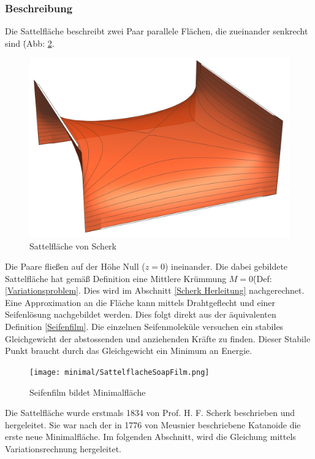 \begin{refsection}
\subsubsection{Beschreibung}
Die Sattelfläche beschreibt zwei Paar parallele Flächen, die zueinander senkrecht sind \.(Abb: \ref{fig:SoapScherk}.
\begin{figure}\label{fig:Scherk}
  \centering
  \includegraphics[scale=0.2]{minimal/HFSherk.png}
  \caption{Sattelfläche von Scherk} 
\end{figure}
Die Paare fließen auf der Höhe Null ($z=0$) ineinander. Die dabei gebildete Sattelfläche hat gemäß Definition eine Mittlere Krümmung $M=0$\.(Def: \ref{Variationsproblem}. Dies wird im Abschnitt \ref{Scherk Herleitung}  nachgerechnet.\\ Eine Approximation an die Fläche kann mittels Drahtgeflecht und einer Seifenlösung nachgebildet werden. Dies folgt direkt aus der äquivalenten Definition \ref{Seifenfilm}. Die einzelnen Seifenmoleküle versuchen ein stabiles Gleichgewicht der abstossenden und anziehenden Kräfte zu finden. Dieser Stabile Punkt braucht durch das Gleichgewicht ein Minimum an Energie.
\begin{figure}\label{fig:SoapScherk}
  \centering
  \texttt{[image: minimal/SattelflacheSoapFilm.png]}
  \caption{Seifenfilm bildet Minimalfläche} 
\end{figure}
Die Sattelfläche wurde erstmals 1834 von Prof. H. F. Scherk beschrieben und hergeleitet. Sie war nach der in 1776 von Meusnier beschriebene Katanoide die erste neue Minimalfläche. Im folgenden Abschnitt, wird die Gleichung mittels Variationsrechnung hergeleitet.

\end{refsection}
